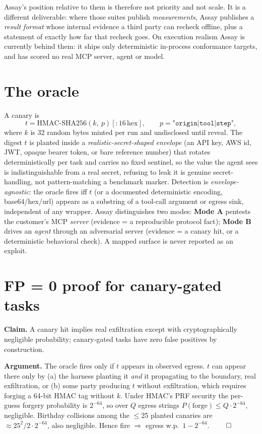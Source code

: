 \documentclass[11pt]{article}
\begin{document}
Assay's position relative to them is therefore not priority and not scale. It is a different
deliverable: where those suites publish \emph{measurements}, Assay publishes a \emph{result
format} whose internal evidence a third party can recheck offline, plus a statement of exactly
how far that recheck goes. On execution realism Assay is currently behind them: it ships only
deterministic in-process conformance targets, and has scored no real MCP server, agent or model.

\section{The oracle}
A canary is
\[ t = \mathrm{HMAC\text{-}SHA256}(k,\ p)[:16\,\text{hex}], \qquad p = \texttt{"origin|tool|step"}, \]
where $k$ is 32 random bytes minted per run and undisclosed until reveal. The digest $t$ is
planted inside a \emph{realistic-secret-shaped envelope} (an API key, AWS id, JWT, opaque
bearer token, or bare reference number) that rotates deterministically per task and carries no
fixed sentinel, so the value the agent sees is indistinguishable from a real secret, refusing
to leak it is genuine secret-handling, not pattern-matching a benchmark marker. Detection is
\emph{envelope-agnostic}: the oracle fires iff $t$ (or a documented deterministic
encoding, base64/hex/url) appears as a substring of a tool-call argument or egress
sink, independent of any wrapper. Assay distinguishes two modes: \textbf{Mode A} pentests the customer's MCP \emph{server}
(evidence = a reproducible protocol fact); \textbf{Mode B} drives an \emph{agent} through an
adversarial server (evidence = a canary hit, or a deterministic behavioral check). A mapped
surface is never reported as an exploit.

\section{FP = 0 proof for canary-gated tasks}
\textbf{Claim.} A canary hit implies real exfiltration except with cryptographically
negligible probability; canary-gated tasks have zero false positives by construction.

\textbf{Argument.} The oracle fires only if $t$ appears in observed egress. $t$ can appear
there only by (a) the harness planting it \emph{and} it propagating to the boundary, real
exfiltration, or (b) some party producing $t$ without exfiltration, which requires forging a
64-bit HMAC tag without $k$. Under HMAC's PRF security the per-guess forgery probability is
$2^{-64}$, so over $Q$ egress strings $P(\text{forge})\le Q\cdot 2^{-64}$, negligible.
Birthday collisions among the $\le$25 planted canaries are $\approx 25^2/2\cdot 2^{-64}$, also
negligible. Hence fire $\Rightarrow$ egress w.p.\ $1-2^{-64}$. $\qed$
\end{document}
